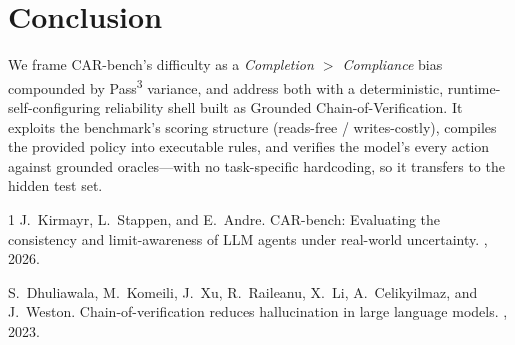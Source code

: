 \documentclass{article}
\begin{document}
\section{Conclusion}
We frame CAR-bench's difficulty as a \emph{Completion $>$ Compliance} bias compounded
by Pass\textsuperscript{3} variance, and address both with a deterministic,
runtime-self-configuring reliability shell built as Grounded Chain-of-Verification.
It exploits the benchmark's scoring structure (reads-free / writes-costly), compiles
the provided policy into executable rules, and verifies the model's every action
against grounded oracles---with no task-specific hardcoding, so it transfers to the
hidden test set.


\begin{thebibliography}{1}
J.~Kirmayr, L.~Stappen, and E.~Andre.
\newblock CAR-bench: Evaluating the consistency and limit-awareness of LLM agents
under real-world uncertainty.
, 2026.

S.~Dhuliawala, M.~Komeili, J.~Xu, R.~Raileanu, X.~Li, A.~Celikyilmaz, and J.~Weston.
\newblock Chain-of-verification reduces hallucination in large language models.
, 2023.
\end{thebibliography}
\end{document}
